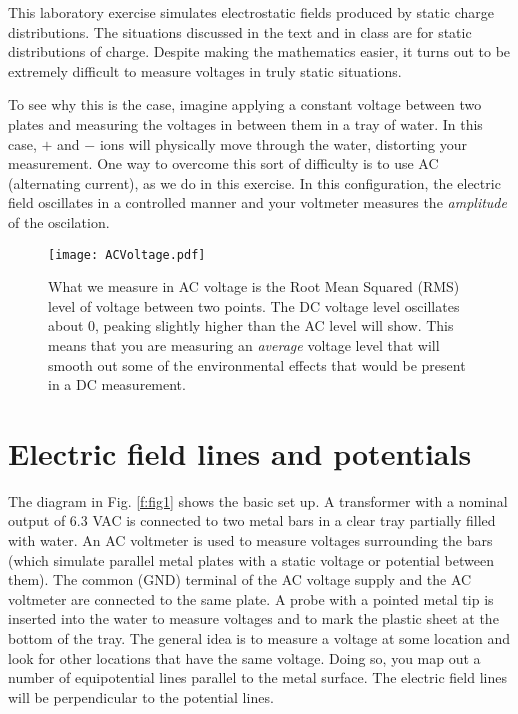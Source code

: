This laboratory exercise simulates electrostatic fields produced by static charge distributions.  The situations discussed in the text and in class are for static distributions of charge.  Despite making the mathematics easier, it turns out to be extremely difficult to measure voltages in truly static situations.  

To see why this is the case, imagine applying a constant voltage between two plates and measuring the voltages in between them in a tray of water.  In this case, $+$ and $-$ ions will physically move through the water, distorting your measurement.  One way to overcome this sort of difficulty is to use AC (alternating current), as we do in this exercise.  In this configuration, the electric field oscillates in a controlled manner and your voltmeter measures the \textit{amplitude} of the oscilation.
\begin{figure}
	\texttt{[image: ACVoltage.pdf]}
	\caption[AC Voltage Level]{What we measure in AC voltage is the Root Mean Squared (RMS) level of voltage between two points.  The DC voltage level oscillates about 0, peaking slightly higher than the AC level will show.  This means that you are measuring an \textit{average} voltage level that will smooth out some of the environmental effects that would be present in a DC measurement.}
\end{figure}

\section{Electric field lines and potentials}
The diagram in Fig. \ref{f:fig1} shows the basic set up.  A transformer with a nominal output of 6.3 VAC is connected to two metal bars in a clear tray partially filled with water.  An AC voltmeter is used to measure voltages surrounding the bars (which simulate parallel metal plates with a static voltage or potential between them).  The common (GND) terminal of the AC voltage supply and the AC voltmeter are connected to the same plate.  A probe with a pointed metal tip is inserted into the water to measure voltages and to mark the plastic sheet at the bottom of the tray.  The general idea is to measure a voltage at some location and look for other locations that have the same voltage.  Doing so, you map out a number of equipotential lines parallel to the metal surface. The electric field lines will be perpendicular to the potential lines.

